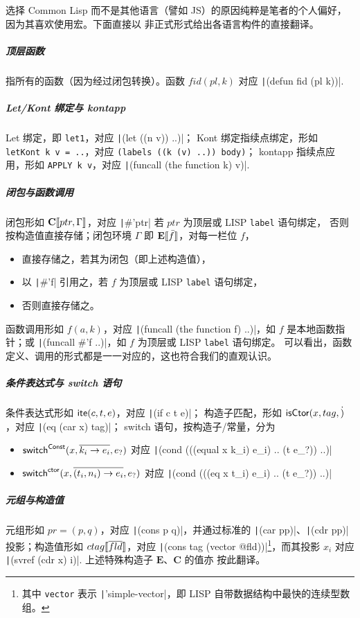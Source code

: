 \documentclass[a4paper, 11pt]{article}
\theoremstyle{remark}\newtheorem*{remark}{Remark}
\theoremstyle{definition}\newtheorem*{definition}{Definition}
\begin{document}
选择 Common Lisp 而不是其他语言（譬如 JS）的原因纯粹是笔者的个人偏好，因为其喜欢使用宏。下面直接以
非正式形式给出各语言构件的直接翻译。
\subparagraph*{顶层函数} 指所有的函数（因为经过闭包转换）。函数 $fid(pl, k)$ 对应 \texttt|(defun fid (pl k))|.
\subparagraph*{Let/Kont 绑定与 kontapp} Let 绑定，即 \texttt{let1}，对应 \texttt|(let ((n v)) ..)|；
Kont 绑定指续点绑定，形如 \texttt{letKont k v = ..}，对应 \texttt{(labels ((k (v) ..)) body)}；
kontapp 指续点应用，形如 \texttt{APPLY k v}，对应 \texttt|(funcall (the function k) v)|.
\subparagraph*{闭包与函数调用} 闭包形如 $\mathbf{C}\llbracket ptr, \Gamma \rrbracket$，对应 \texttt|#'ptr| 若 $ptr$ 为顶层或 LISP \texttt{label} 语句绑定，
否则按构造值直接存储；闭包环境 $\Gamma$ 即 $\mathbf{E}\llbracket \bar{f} \rrbracket$，对每一栏位 $f$，
\begin{itemize}\itemsep0em
  \item 直接存储之，若其为闭包（即上述构造值），
    \item 以 \texttt|#'f| 引用之，若 $f$ 为顶层或 LISP \texttt{label} 语句绑定，
  \item 否则直接存储之。
\end{itemize}

函数调用形如 $f(a, k)$，对应 \texttt|(funcall (the function f) ..)|，如 $f$ 是本地函数指针；或 \texttt|(funcall #'f ..)|，如 $f$ 为顶层或 LISP \texttt{label} 语句绑定。
可以看出，函数定义、调用的形式都是一一对应的，这也符合我们的直观认识。
\subparagraph*{条件表达式与 switch 语句} 条件表达式形如 $\mathsf{ite}(c,t,e)$，对应 \texttt|(if c t e)|；
构造子匹配，形如 $\mathsf{isCtor}(x, tag, \dot)$，对应 \texttt|(eq (car x) tag)|；
switch 语句，按构造子/常量，分为
\begin{itemize}\itemsep0em
  \item $\mathsf{switch}^{\mathsf{Const}}(x, \overline{k_i \to e_i}, e_?)$ 对应
    \texttt|(cond (((equal x k_i) e_i) .. (t e_?)) ..)|
  \item $\mathsf{switch}^{\mathsf{ctor}}(x, \overline{(t_i, n_i) \to e_i}, e_?)$ 对应
    \texttt|(cond (((eq x t_i) e_i) .. (t e_?)) ..)|
\end{itemize}
\subparagraph*{元组与构造值} 元组形如 $pr = (p, q)$，对应 \texttt|(cons p q)|，并通过标准的
\texttt|(car pp)|、\texttt|(cdr pp)| 投影；构造值形如 $ctag\llbracket \overline{fld} \rrbracket$，对应
\texttt|(cons tag (vector @fld))|\footnote{
  其中 \texttt{vector} 表示 \texttt|'simple-vector|，即 LISP 自带数据结构中最快的连续型数组。
}，而其投影 $x_i$ 对应 \texttt|(svref (cdr x) i)|. 上述特殊构造子 $\mathbf{E}$、$\mathbf{C}$ 的值亦
按此翻译。
\end{document}
